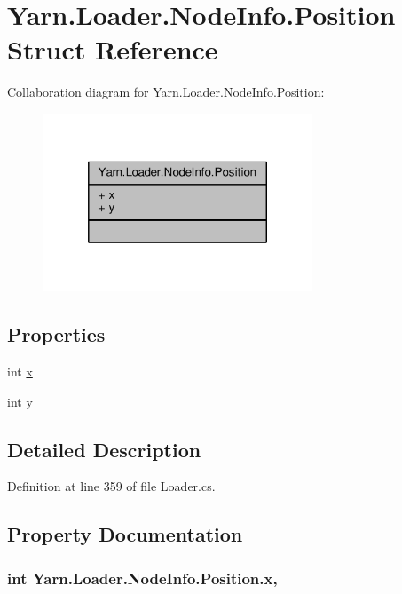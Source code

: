 \hypertarget{a00145}{\section{Yarn.\-Loader.\-Node\-Info.\-Position Struct Reference}
\label{a00145}
}


Collaboration diagram for Yarn.\-Loader.\-Node\-Info.\-Position\-:
\nopagebreak
\begin{figure}[H]
\begin{center}
\leavevmode
\includegraphics[width=228pt]{a00653}
\end{center}
\end{figure}
\subsection*{Properties}
\begin{DoxyCompactItemize}
\item 
int \hyperlink{a00145_a6b40110781090293fbcd2d6f7695ae4d}{x}
\item 
int \hyperlink{a00145_a390d560bd9faa3a32d8a0489c69be9e0}{y}
\end{DoxyCompactItemize}


\subsection{Detailed Description}


Definition at line 359 of file Loader.\-cs.



\subsection{Property Documentation}
\hypertarget{a00145_a6b40110781090293fbcd2d6f7695ae4d}{
\subsubsection[{x}]{\setlength{\rightskip}{0pt plus 5cm}int Yarn.\-Loader.\-Node\-Info.\-Position.\-x\hspace{0.3cm}{\ttfamily [get]}, {\ttfamily [set]}}}\label{a00145_a6b40110781090293fbcd2d6f7695ae4d}


